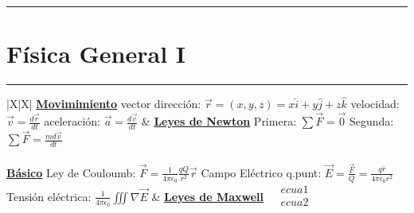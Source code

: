 \documentclass[../main.tex]{subfiles}
\begin{document}
\everymath{\displaystyle}
\vspace{0.2in}
\hrule
\vspace{0.2in}
\section{Física General I}
\vspace{0.1in}
\hrule
\begin{xltabular}{\textwidth}{|X|X|}
	\hline
	\underline{\textbf{Movimimiento}}
	\newline\newline
	vector dirección: $\vec{r} = (x,y,z) = x\hat{i} +y\hat{j}+z\hat{k}$\newline
	velocidad: $\vec{v} = \frac{d\vec{r}}{dt}$\newline
	aceleración: $\vec{a} = \frac{d\vec{v}}{dt}$
	\newline\newline
	&
	\underline{\textbf{Leyes de Newton}}
	\newline\newline
	Primera: $\sum \vec{F} = \vec{0}$\newline
	Segunda: $\sum \vec{F} = \frac{md\vec{v}}{dt}$\newline
	\newline\newline
	\\
	\hline
	\\
	\hline
	\underline{\textbf{Básico}}
	\newline
	Ley de Couloumb: $\vec{F} = \frac{1}{4\pi\epsilon_0}\frac{qQ}{r^2}\vec{r}$\newline
	Campo Eléctrico q.punt: $\vec{E} = \frac{\vec{F}}{Q} = \frac{q\hat{r}}{4\pi\epsilon_0 r^2}$\newline
	Tensión eléctrica: $\frac{1}{4\pi\epsilon_0} \iiint \nabla\vec{E}$
	\newline\newline
	&
	\underline{\textbf{Leyes de Maxwell}}
	$\begin{aligned}
			 & ecua1 \\
			 & ecua2 \\
		\end{aligned}$
	\newline\newline\\
	\hline
\end{xltabular}
\end{document}
